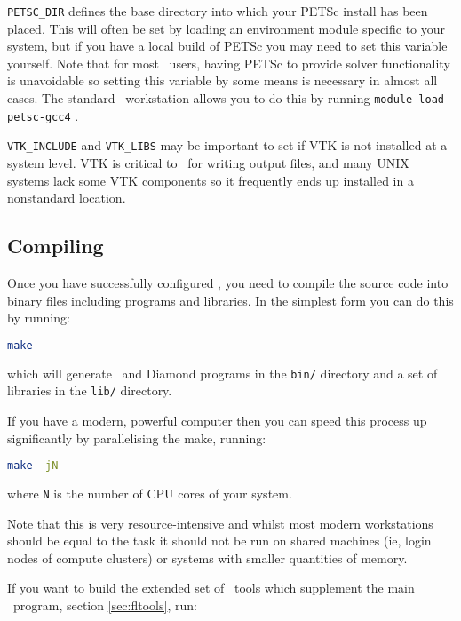 \lstinline[language=Bash]+PETSC_DIR+ defines the base directory into which your
PETSc install has been placed. This will often be set by loading an environment
module specific to your system, but if you have a local build of PETSc you may
need to set this variable yourself. Note that for most \fluidity\ users, having
PETSc to provide solver functionality is unavoidable so setting this variable
by some means is necessary in almost all cases. The standard \fluidity\
workstation allows you to do this by running
\lstinline[language=Bash]+module load petsc-gcc4+ .

\lstinline[language=Bash]+VTK_INCLUDE+ and \lstinline[language=Bash]+VTK_LIBS+
may be important to set if VTK is not installed at a system level. VTK is
critical to \fluidity\ for writing output files, and many UNIX systems lack some
VTK components so it frequently ends up installed in a nonstandard location.

\subsection{Compiling \fluidity}
\label{sec:compiling_fluidity}

Once you have successfully configured \fluidity, you need to compile the source
code into binary files including programs and libraries. In the simplest form
you can do this by running:

\begin{lstlisting}[language=Bash]
make
\end{lstlisting}

which will generate \fluidity\ and Diamond programs in the
\lstinline[language=Bash]+bin/+ directory and a set of libraries in the
\lstinline[language=Bash]+lib/+ directory. 

If you have a modern, powerful computer then you can speed this process up
significantly by parallelising the make, running:

\begin{lstlisting}[language=Bash]
make -jN
\end{lstlisting}
where \lstinline[language=Bash]+N+ is the number of CPU cores of your system.

Note that this is very resource-intensive and whilst most modern workstations
should be equal to the task it should not be run on shared machines (ie, login
nodes of compute clusters) or systems with smaller quantities of memory.

If you want to build the extended set of \fluidity\ tools which supplement the
main \fluidity\ program, section \ref{sec:fltools}, run:


